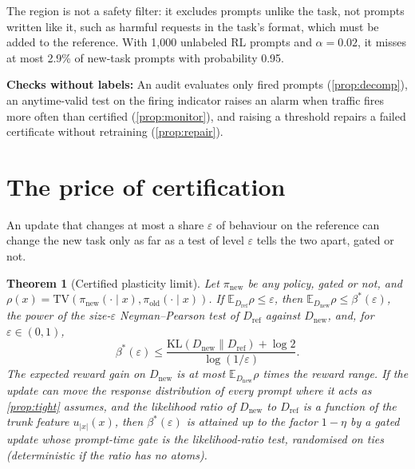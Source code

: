 \documentclass{article}
\theoremstyle{plain}
\newtheorem{theorem}{Theorem}[section]
\theoremstyle{definition}
\theoremstyle{remark}
\newcommand{\E}{\mathbb{E}}
\newcommand{\TV}{\mathrm{TV}}
\newcommand{\KL}{\mathrm{KL}}
\newcommand{\Dref}{D_{\mathrm{ref}}}
\newcommand{\Dnew}{D_{\mathrm{new}}}
\newcommand{\pold}{\pi_{\mathrm{old}}}
\newcommand{\pnew}{\pi_{\mathrm{new}}}
\begin{document}
The region is not a safety filter: it excludes prompts unlike the task, not prompts written like it, such as
harmful requests in the task's format, which must be added to the reference. With 1{,}000 unlabeled RL prompts
and $\alpha=0.02$, it misses at most 2.9\% of new-task prompts with probability 0.95.

\textbf{Checks without labels:}\label{sec:monitor} An audit evaluates only fired prompts (\cref{prop:decomp}), an anytime-valid test
\citep{ramdas2023gametheoretic} on the firing indicator raises an alarm when traffic fires more often than certified
(\cref{prop:monitor}), and raising a threshold repairs a failed certificate without retraining (\cref{prop:repair}).

\section{The price of certification}
\label{sec:limit}

An update that changes at most a share $\varepsilon$ of behaviour on the reference can change the new task only
as far as a test of level $\varepsilon$ tells the two apart, gated or not.

\begin{theorem}[Certified plasticity limit]
\label{thm:limit}
Let $\pnew$ be any policy, gated or not, and $\rho(x)=\TV(\pnew(\cdot\mid x),\pold(\cdot\mid x))$. If
$\E_{\Dref}\rho\le\varepsilon$, then $\E_{\Dnew}\rho\le\beta^\ast(\varepsilon)$, the power of the
size-$\varepsilon$ Neyman--Pearson test of $\Dref$ against $\Dnew$, and, for $\varepsilon\in(0,1)$,
\begin{equation}
\beta^\ast(\varepsilon)\le\frac{\KL(\Dnew\|\Dref)+\log 2}{\log(1/\varepsilon)}.
\label{eq:limit}
\end{equation}
The expected reward gain on $\Dnew$ is at most $\E_{\Dnew}\rho$ times the reward range. If the update can move
the response distribution of every prompt where it acts as \cref{prop:tight} assumes, and the likelihood ratio of
$\Dnew$ to $\Dref$ is a function of the trunk feature $u_{|x|}(x)$, then $\beta^\ast(\varepsilon)$ is attained up to
the factor $1-\eta$ by a gated update whose prompt-time gate is the likelihood-ratio test, randomised on ties
(deterministic if the ratio has no atoms).
\end{theorem}
\end{document}
